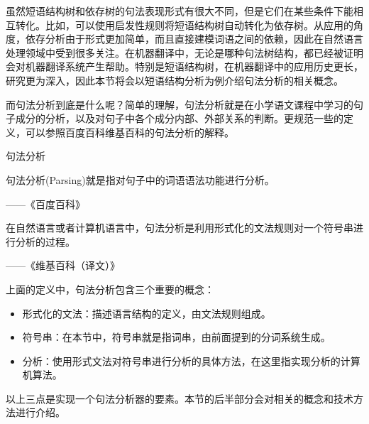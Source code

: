 \parinterval 虽然短语结构树和依存树的句法表现形式有很大不同，但是它们在某些条件下能相互转化。比如，可以使用启发性规则将短语结构树自动转化为依存树。从应用的角度，依存分析由于形式更加简单，而且直接建模词语之间的依赖，因此在自然语言处理领域中受到很多关注。在机器翻译中，无论是哪种句法树结构，都已经被证明会对机器翻译系统产生帮助。特别是短语结构树，在机器翻译中的应用历史更长，研究更为深入，因此本节将会以短语结构分析为例介绍句法分析的相关概念。

\parinterval 而句法分析到底是什么呢？简单的理解，句法分析就是在小学语文课程中学习的句子成分的分析，以及对句子中各个成分内部、外部关系的判断。更规范一些的定义，可以参照百度百科维基百科的句法分析的解释。

\vspace{-0.0em}
\begin{definition} 句法分析

句法分析(Parsing)就是指对句子中的词语语法功能进行分析。
\begin{flushright}——《百度百科》\end{flushright}

在自然语言或者计算机语言中，句法分析是利用形式化的文法规则对一个符号串进行分析的过程。
\begin{flushright}——《维基百科（译文）》\end{flushright}
\end{definition}

\parinterval 上面的定义中，句法分析包含三个重要的概念：

\begin{itemize}
\vspace{0.5em}
\item 形式化的文法：描述语言结构的定义，由文法规则组成。
\vspace{0.5em}
\item 符号串：在本节中，符号串就是指词串，由前面提到的分词系统生成。
\vspace{0.5em}
\item 分析：使用形式文法对符号串进行分析的具体方法，在这里指实现分析的计算机算法。
\vspace{0.5em}
\end{itemize}

\parinterval 以上三点是实现一个句法分析器的要素。本节的后半部分会对相关的概念和技术方法进行介绍。
\vspace{-0.5em}


